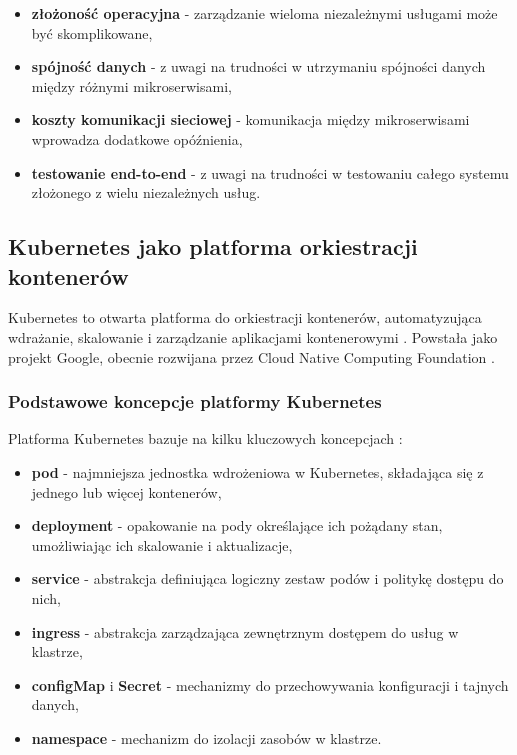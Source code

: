 \begin{itemize}
    \item \textbf{złożoność operacyjna} - zarządzanie wieloma niezależnymi usługami może być skomplikowane,
    \item \textbf{spójność danych} - z uwagi na trudności w utrzymaniu spójności danych między różnymi mikroserwisami,
    \item \textbf{koszty komunikacji sieciowej} - komunikacja między mikroserwisami wprowadza dodatkowe opóźnienia,
    \item \textbf{testowanie end-to-end} - z uwagi na trudności w testowaniu całego systemu złożonego z wielu niezależnych usług.
\end{itemize}

\subsection{Kubernetes jako platforma orkiestracji kontenerów}
\label{subsec:kubernetes}

Kubernetes to otwarta platforma do orkiestracji kontenerów, automatyzująca wdrażanie, skalowanie i zarządzanie aplikacjami
kontenerowymi \cite{kubernetes}. Powstała jako projekt Google, obecnie rozwijana przez Cloud Native Computing Foundation \cite{cncf_website}.

\subsubsection{Podstawowe koncepcje platformy Kubernetes}
\label{subsubsec:podstawy_kubernetes}

Platforma Kubernetes bazuje na kilku kluczowych koncepcjach \cite{kubernetes_concepts}:

\begin{itemize}
    \item \textbf{pod} - najmniejsza jednostka wdrożeniowa w Kubernetes, składająca się z jednego lub więcej kontenerów,
    \item \textbf{deployment} - opakowanie na pody określające ich pożądany stan, umożliwiając ich skalowanie i aktualizacje,
    \item \textbf{service} - abstrakcja definiująca logiczny zestaw podów i politykę dostępu do nich,
    \item \textbf{ingress} - abstrakcja zarządzająca zewnętrznym dostępem do usług w klastrze,
    \item \textbf{configMap} i \textbf{Secret} - mechanizmy do przechowywania konfiguracji i tajnych danych,
    \item \textbf{namespace} - mechanizm do izolacji zasobów w klastrze.
\end{itemize}

